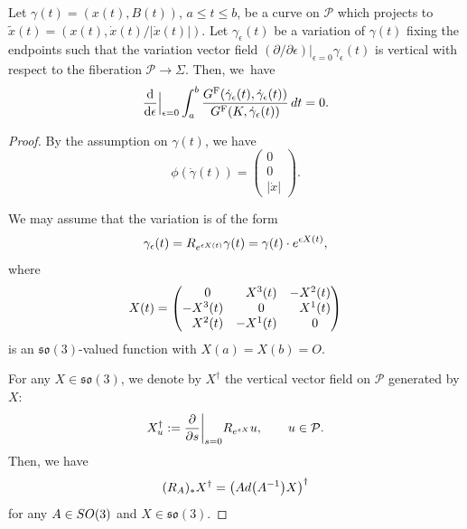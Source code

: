 \documentclass[10pt,a4paper]{amsart}
\begin{document}
\begin{Proposition}\label{vertical-variation}
Let $\gamma(t)=(x(t), B(t))$, $a\le t\le b$, be a curve on $\mathcal{P}$ which projects to $\tilde x(t)=(x(t), \dot x(t)/|\dot x(t)|)$. Let $\gamma_\epsilon(t)$ be a variation of $\gamma(t)$ fixing the endpoints such that the variation vector field $(\partial/\partial \epsilon)|_{\epsilon=0}\gamma_\epsilon(t)$ is vertical with respect to the fiberation $\mathcal{P}\to \Sigma$. Then, we~have
\[
\frac{\mathrm{d}}{\mathrm{d} \epsilon}\Big|_{\epsilon=0}
\int _a^b \frac{G^{\mathrm{F}}(\dot \gamma_\epsilon(t), \dot \gamma_\epsilon(t))}{G^{\mathrm{F}}(K, \dot \gamma_\epsilon(t))}\,{\rm d}t=0.
\]
\end{Proposition}

\begin{proof}
By the assumption on $\gamma(t)$, we have
\begin{equation}\label{phi-gamma}
\phi(\dot\gamma(t))=\begin{pmatrix} 0 \\ 0 \\ |\dot x|\end{pmatrix}.
\end{equation}

We may assume that the variation is of the form
\[
\gamma_\epsilon(t)=R_{{\rm e}^{\epsilon X(t)}}\gamma(t)=\gamma(t)\cdot {\rm e}^{\epsilon X(t)},
\]
where
\[
X(t)=\begin{pmatrix}
\hphantom{-}0 & \hphantom{-}X^3(t) & -X^2(t) \\
-X^3(t) & \hphantom{-}0 & \hphantom{-}X^1(t) \\
\hphantom{-}X^2(t) & -X^1(t) & \hphantom{-}0
\end{pmatrix}
\]
is an $\mathfrak{so}(3)$-valued function with $X(a)=X(b)=O$.

For any $X\in\mathfrak{so}(3)$, we denote by $X^\dagger$ the vertical vector field on $\mathcal{P}$ generated by $X$:
\[
X^\dagger_u:=\frac{\partial}{\partial s}\biggl|_{s=0}R_{{\rm e}^{sX}} u, \qquad u\in \mathcal{P}.
\]
Then, we have
\[
(R_{A})_* X^\dagger=\bigl({\rm Ad}\bigl(A^{-1}\bigr)X\bigr)^\dagger
\]
for any $A\in{\rm SO}(3)$ and $X\in\mathfrak{so}(3)$.


\end{proof}
\end{document}
